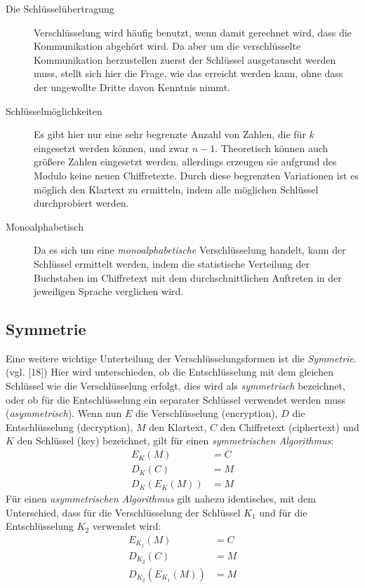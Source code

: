 \documentclass{scrarticle} %
\begin{document}
    \begin{description}
        \item[Die Schlüsselübertragung] Verschlüsselung wird häufig benutzt, wenn damit gerechnet wird, dass die Kommunikation abgehört wird. Da aber um die verschlüsselte Kommunikation herzustellen zuerst der Schlüssel ausgetauscht werden muss, stellt sich hier die Frage, wie das erreicht werden kann, ohne dass der ungewollte Dritte davon Kenntnis nimmt.
        \item[Schlüsselmöglichkeiten] Es gibt hier nur eine sehr begrenzte Anzahl von Zahlen, die für $k$ eingesetzt werden können, und zwar $n-1$. Theoretisch können auch größere Zahlen eingesetzt werden, allerdings erzeugen sie aufgrund des Modulo keine neuen Chiffretexte. Durch diese begrenzten Variationen ist es möglich den Klartext zu ermitteln, indem alle möglichen Schlüssel durchprobiert werden.
        \item[Monoalphabetisch] Da es sich um eine \emph{monoalphabetische} Verschlüsselung handelt, kann der Schlüssel ermittelt werden, indem die statistische Verteilung der Buchstaben im Chiffretext mit dem durchschnittlichen Auftreten in der jeweiligen Sprache verglichen wird.
    \end{description}

    \subsection{Symmetrie}  %
        Eine weitere wichtige Unterteilung der Verschlüsselungsformen ist die \emph{Symmetrie}. (vgl. \cite{ertel2003}[18]) Hier wird unterschieden, ob die Entschlüsselung mit dem gleichen Schlüssel wie die Verschlüsselung erfolgt, dies wird als \emph{symmetrisch} bezeichnet, oder ob für die Entschlüsselung ein separater Schlüssel verwendet werden muss (\emph{asymmetrisch}). Wenn nun $E$ die Verschlüsselung (encryption), $D$ die Entschlüsselung (decryption), $M$ den Klartext, $C$ den Chiffretext (ciphertext) und $K$ den Schlüssel (key) bezeichnet, gilt für einen \emph{symmetrischen Algorithmus}: %
        \begin{align}
            E_K(M) &= C\\
            D_K(C) &= M\\
            D_K\left(E_K(M)\right) &= M
        \end{align}
        Für einen \emph{asymmetrischen Algorithmus} gilt nahezu identisches, mit dem Unterschied, dass für die Verschlüsselung der Schlüssel $K_1$ und für die Entschlüsselung $K_2$ verwendet wird:    %
        \begin{align}
            E_{K_1}(M) &= C \label{eq:funf} \\
            D_{K_2}(C) &= M \label{eq:sechs}    \\
            D_{K_2}\left(E_{K_1}(M)\right) &= M     \label{eq:sieben}
        \end{align}
\end{document}
